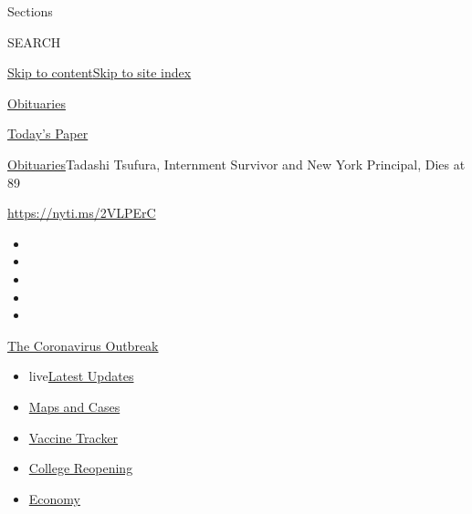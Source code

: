 Sections

SEARCH

\protect\hyperlink{site-content}{Skip to
content}\protect\hyperlink{site-index}{Skip to site index}

\href{https://www.nytimes.com/section/obituaries}{Obituaries}

\href{https://myaccount.nytimes.com/auth/login?response_type=cookie\&client_id=vi}{}

\href{https://www.nytimes.com/section/todayspaper}{Today's Paper}

\href{/section/obituaries}{Obituaries}\textbar{}Tadashi Tsufura,
Internment Survivor and New York Principal, Dies at 89

\url{https://nyti.ms/2VLPErC}

\begin{itemize}
\item
\item
\item
\item
\item
\end{itemize}

\href{https://www.nytimes.com/news-event/coronavirus?action=click\&pgtype=Article\&state=default\&region=TOP_BANNER\&context=storylines_menu}{The
Coronavirus Outbreak}

\begin{itemize}
\tightlist
\item
  live\href{https://www.nytimes.com/2020/08/03/world/coronavirus-covid-19.html?action=click\&pgtype=Article\&state=default\&region=TOP_BANNER\&context=storylines_menu}{Latest
  Updates}
\item
  \href{https://www.nytimes.com/interactive/2020/us/coronavirus-us-cases.html?action=click\&pgtype=Article\&state=default\&region=TOP_BANNER\&context=storylines_menu}{Maps
  and Cases}
\item
  \href{https://www.nytimes.com/interactive/2020/science/coronavirus-vaccine-tracker.html?action=click\&pgtype=Article\&state=default\&region=TOP_BANNER\&context=storylines_menu}{Vaccine
  Tracker}
\item
  \href{https://www.nytimes.com/2020/08/02/us/covid-college-reopening.html?action=click\&pgtype=Article\&state=default\&region=TOP_BANNER\&context=storylines_menu}{College
  Reopening}
\item
  \href{https://www.nytimes.com/live/2020/08/03/business/stock-market-today-coronavirus?action=click\&pgtype=Article\&state=default\&region=TOP_BANNER\&context=storylines_menu}{Economy}
\end{itemize}

